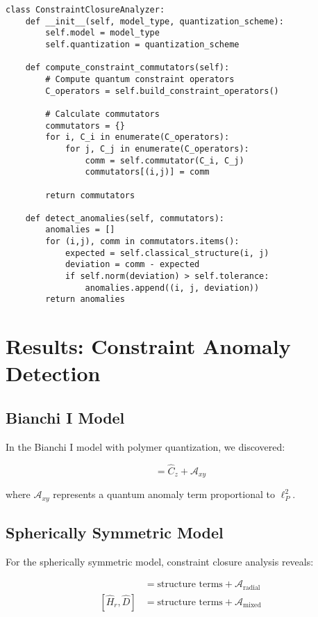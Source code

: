 \documentclass[11pt]{article}
\begin{document}
\begin{verbatim}
class ConstraintClosureAnalyzer:
    def __init__(self, model_type, quantization_scheme):
        self.model = model_type
        self.quantization = quantization_scheme
        
    def compute_constraint_commutators(self):
        # Compute quantum constraint operators
        C_operators = self.build_constraint_operators()
        
        # Calculate commutators
        commutators = {}
        for i, C_i in enumerate(C_operators):
            for j, C_j in enumerate(C_operators):
                comm = self.commutator(C_i, C_j)
                commutators[(i,j)] = comm
                
        return commutators
        
    def detect_anomalies(self, commutators):
        anomalies = []
        for (i,j), comm in commutators.items():
            expected = self.classical_structure(i, j)
            deviation = comm - expected
            if self.norm(deviation) > self.tolerance:
                anomalies.append((i, j, deviation))
        return anomalies
\end{verbatim}

\section{Results: Constraint Anomaly Detection}

\subsection{Bianchi I Model}

In the Bianchi I model with polymer quantization, we discovered:

\begin{equation}
[\hat{C}_x, \hat{C}_y] = \hat{C}_z + \mathcal{A}_{xy}
\end{equation}

where $\mathcal{A}_{xy}$ represents a quantum anomaly term proportional to $\ell_P^2$.

\subsection{Spherically Symmetric Model}

For the spherically symmetric model, constraint closure analysis reveals:

\begin{align}
[\hat{H}_r, \hat{H}_r'] &= \text{structure terms} + \mathcal{A}_{\text{radial}} \\
[\hat{H}_r, \hat{D}] &= \text{structure terms} + \mathcal{A}_{\text{mixed}}
\end{align}
\end{document}
